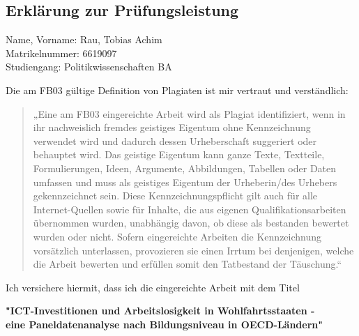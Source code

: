 \newpage


\subsection{Erklärung zur Prüfungsleistung}

{\footnotesize

    Name, Vorname: Rau, Tobias Achim \\
    Matrikelnummer: 6619097 \\
    Studiengang: Politikwissenschaften BA

    \vspace{0.5cm}

    Die am FB03 gültige Definition von Plagiaten ist mir vertraut und verständlich: 

    \begin{quote}
        „Eine am FB03 eingereichte Arbeit wird als Plagiat identifiziert, wenn in ihr nachweislich 
        fremdes geistiges Eigentum ohne Kennzeichnung verwendet wird und dadurch dessen Urheberschaft 
        suggeriert oder behauptet wird. Das geistige Eigentum kann ganze Texte, Textteile, 
        Formulierungen, Ideen, Argumente, Abbildungen, Tabellen oder Daten umfassen und muss als 
        geistiges Eigentum der Urheberin/des Urhebers gekennzeichnet sein. Diese 
        Kennzeichnungspflicht gilt auch für alle Internet-Quellen sowie für Inhalte, die aus eigenen 
        Qualifikationsarbeiten übernommen wurden, unabhängig davon, ob diese als bestanden bewertet 
        wurden oder nicht. Sofern eingereichte Arbeiten die Kennzeichnung vorsätzlich unterlassen, 
        provozieren sie einen Irrtum bei denjenigen, welche die Arbeit bewerten und erfüllen somit 
        den Tatbestand der Täuschung.“  
    \end{quote}

    Ich versichere hiermit, dass ich die eingereichte Arbeit mit dem Titel 

    \begin{center}
        \textbf{"\ac{ICT}-Investitionen und Arbeitslosigkeit in Wohlfahrtsstaaten - \\ 
        eine Paneldatenanalyse nach Bildungsniveau in OECD-Ländern"} \\ 
    \end{center}

}
